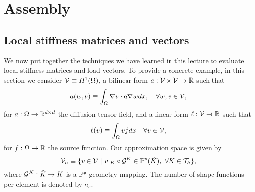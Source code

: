 \section{Assembly}
\label{sec:fe_assembly}
\subsection{Local stiffness matrices and vectors}
We now put together the techniques we have learned in this lecture to evaluate local stiffness matrices and load vectors.  To provide a concrete example, in this section we consider $\mathcal{V} \equiv H^1(\Omega)$, a bilinear form $a: \mathcal{V} \times \mathcal{V} \to \mathbb{R}$ such that
\begin{equation}
  a(w,v) \equiv \int_\Omega \nabla v \cdot a \nabla w dx , \quad \forall w,v \in \mathcal{V},
  \label{eq:fe_impl_model_a}
\end{equation}
for $a: \Omega \to \mathbb{R}^{d \times d}$ the diffusion tensor field, and a linear form $\ell: \mathcal{V} \to \mathbb{R}$ such that
\begin{equation}
  \ell(v) \equiv \int_\Omega v f dx \quad \forall v \in \mathcal{V},
  \label{eq:fe_impl_model_ell}
\end{equation}
for $f: \Omega \to \mathbb{R}$ the source function. Our approximation space is given by
\begin{equation}
  \calV_h \equiv \{ v \in \calV \ | \ v|_K \circ \calG^K \in \PP^p(\tilde K), \ \forall K \in \calT_h \},
  \label{eq:fe_impl_loc_vh}
\end{equation}
where $\mathcal{G}^K: \tilde K \to K$ is a $\mathbb{P}^p$ geometry mapping. The number of shape functions per element is denoted by $n_s$.

